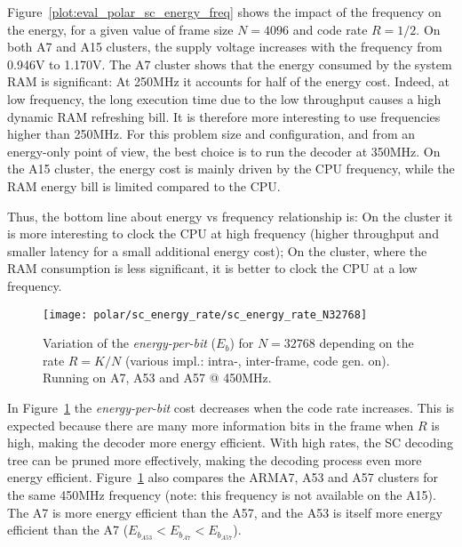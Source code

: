 Figure~\ref{plot:eval_polar_sc_energy_freq} shows the impact of the frequency on
the energy, for a given value of frame size $N=4096$ and code rate $R=1/2$. On
both A7 and A15 clusters, the supply voltage increases with the frequency from
0.946V to 1.170V. The A7 \little cluster shows that the energy consumed by the
system RAM is significant: At 250MHz it accounts for half of the energy cost.
Indeed, at low frequency, the long execution time due to the low throughput
causes a high dynamic RAM refreshing bill. It is therefore more interesting to
use frequencies higher than 250MHz. For this problem size and configuration, and
from an energy-only point of view, the best choice is to run the decoder at
350MHz. On the A15 \big cluster, the energy cost is mainly driven by the CPU
frequency, while the RAM energy bill is limited compared to the CPU.

Thus, the bottom line about energy vs frequency relationship is: On the \little
cluster it is more interesting to clock the CPU at high frequency (higher
throughput and smaller latency for a small additional energy cost); On the
\big cluster, where the RAM consumption is less significant, it is better to
clock the CPU at a low frequency.

\begin{figure}[htp]
  \centering
  \texttt{[image: polar/sc\_energy\_rate/sc\_energy\_rate\_N32768]}
  \caption{Variation of the \emph{energy-per-bit} ($E_b$) for $N = 32768$
    depending on the rate $R = K / N$ (various impl.: intra-, inter-frame, code
    gen. on). Running on A7, A53 and A57 @ 450MHz.}
  \label{plot:eval_polar_sc_energy_rate}
\end{figure}

In Figure~\ref{plot:eval_polar_sc_energy_rate} the \emph{energy-per-bit} cost
decreases when the code rate increases. This is expected because there are many
more information bits in the frame when $R$ is high, making the decoder more
energy efficient. With high rates, the SC decoding tree can be pruned more
effectively, making the decoding process even more energy efficient.
Figure~\ref{plot:eval_polar_sc_energy_rate} also compares the ARM\R A7, A53 and
A57 clusters for the same 450MHz frequency (note: this frequency is not
available on the A15). The \little A7 is more energy efficient than the \big
A57, and the \little A53 is itself more energy efficient than the \little A7
($E_{b_{A53}} < E_{b_{A7}} < E_{b_{A57}}$).


